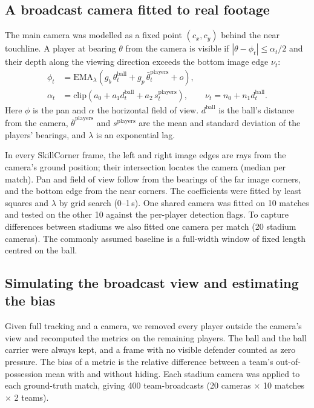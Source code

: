 \documentclass[11pt]{article}
\begin{document}
\subsection{A broadcast camera fitted to real footage}
The main camera was modelled as a fixed point $(c_x, c_y)$ behind the near touchline. A player at bearing $\theta$
from the camera is visible if $|\theta - \phi_t| \le \alpha_t/2$ and their depth along the viewing direction exceeds
the bottom image edge $\nu_t$:
\begin{align}
\phi_t &= \mathrm{EMA}_{\lambda}\!\left(g_b\,\theta^{\text{ball}}_t + g_p\,\bar\theta^{\text{players}}_t + o\right),\\
\alpha_t &= \mathrm{clip}\!\left(a_0 + a_1 d^{\text{ball}}_t + a_2\, s^{\text{players}}_t\right),\qquad
\nu_t = n_0 + n_1 d^{\text{ball}}_t.
\end{align}
Here $\phi$ is the pan and $\alpha$ the horizontal field of view. $d^{\text{ball}}$ is the ball's distance from the
camera, $\bar\theta^{\text{players}}$ and $s^{\text{players}}$ are the mean and standard deviation of the players'
bearings, and $\lambda$ is an exponential lag.

In every SkillCorner frame, the left and right image edges are rays from the camera's ground position; their
intersection locates the camera (median per match). Pan and field of view follow from the bearings of the far image
corners, and the bottom edge from the near corners. The coefficients were fitted by least squares and $\lambda$ by
grid search (0--1\,s). One shared camera was fitted on 10 matches and tested on the other 10 against the per-player
detection flags. To capture differences between stadiums we also fitted one camera per match (20 stadium cameras).
The commonly assumed baseline is a full-width window of fixed length centred on the ball.

\subsection{Simulating the broadcast view and estimating the bias}
Given full tracking and a camera, we removed every player outside the camera's view and recomputed the metrics on the
remaining players. The ball and the ball carrier were always kept, and a frame with no visible defender counted as
zero pressure. The bias of a metric is the relative difference between a team's out-of-possession mean with and
without hiding. Each stadium camera was applied to each ground-truth match, giving 400 team-broadcasts
(20 cameras $\times$ 10 matches $\times$ 2 teams).
\end{document}

